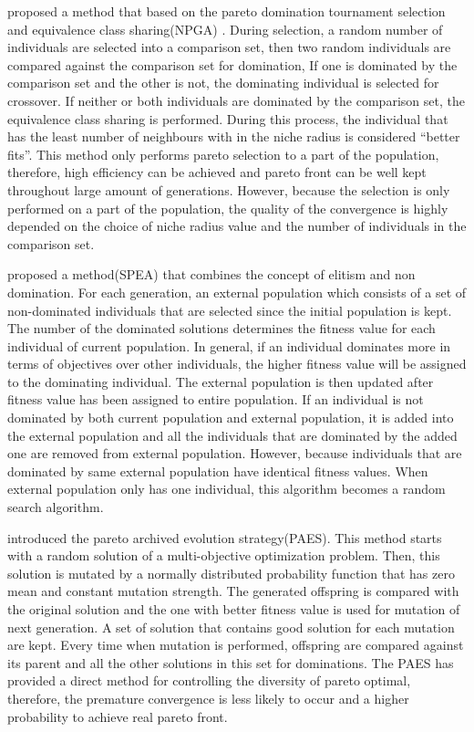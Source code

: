  proposed a method that based on the pareto domination tournament selection and equivalence class sharing(NPGA) . During selection, a random number of individuals are selected into a comparison set, then two random individuals are compared against the comparison set for domination, If one is dominated by the comparison set and the other is not, the dominating individual is selected for crossover. If neither or both individuals are dominated by the comparison set, the equivalence class sharing is performed. During this process, the individual that has the least number of neighbours with in the niche radius  is considered ``better fits''. This method only performs pareto selection to a part of the population, therefore, high efficiency can be achieved and pareto front can be well kept throughout large amount of generations. However, because the selection is only performed on a part of the population, the quality of the convergence is highly depended on the choice of  niche radius value and the number of individuals in the comparison set.     

 proposed a method(SPEA) that combines the concept of elitism and non domination. For each generation, an external population which consists of a set of non-dominated individuals that are selected since the initial population is kept. The number of the dominated solutions determines the fitness value for each individual of current population. In general, if an individual dominates more in terms of objectives over other individuals, the higher fitness value will be assigned to the dominating individual. The external population is then updated after fitness value has been assigned to entire population. If an individual is not dominated by both current population and external population, it is added into the external population and all the individuals that are dominated by the added one are removed from external population. However, because individuals that are dominated by same external population have identical fitness values. When external population only has one individual, this algorithm becomes a random search algorithm. 

 introduced the pareto archived evolution strategy(PAES). This method starts with a random solution of a multi-objective optimization problem. Then, this solution is mutated by a normally distributed probability function that has zero mean and constant mutation strength. The generated offspring is compared with the original solution and the one with better fitness value is used for mutation of next generation. A set of solution that contains good solution for each mutation are kept. Every time when mutation is performed, offspring are compared against its parent and all the other solutions in this set for dominations. The PAES has provided a direct method for controlling the diversity of pareto optimal, therefore, the premature convergence is less likely to occur and a higher probability to achieve real pareto front. 

